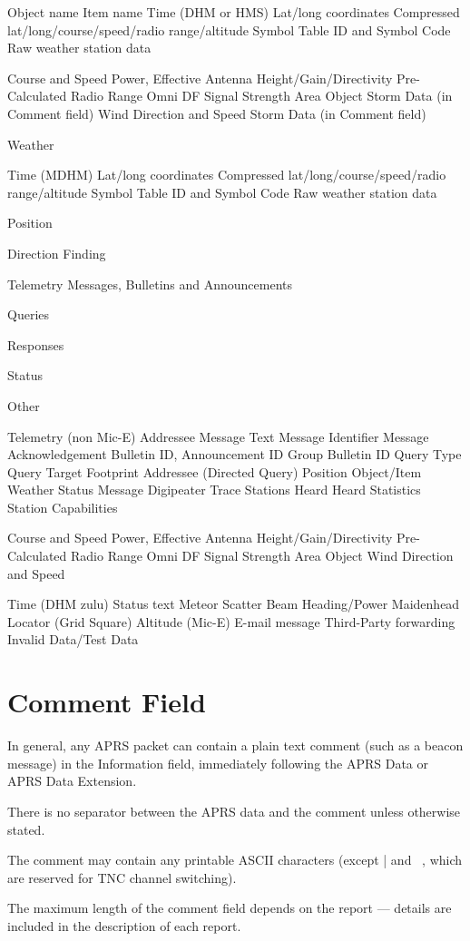 Object name
Item name
Time (DHM or HMS)
Lat/long coordinates
Compressed lat/long/course/speed/radio range/altitude
Symbol Table ID and Symbol Code
Raw weather station data

Course and Speed
Power, Effective Antenna Height/Gain/Directivity
Pre-Calculated Radio Range
Omni DF Signal Strength
Area Object
Storm Data (in Comment field)
Wind Direction and Speed
Storm Data (in Comment field)

Weather

Time (MDHM)
Lat/long coordinates
Compressed lat/long/course/speed/radio range/altitude
Symbol Table ID and Symbol Code
Raw weather station data

Position

Direction Finding

Telemetry
Messages,
Bulletins and
Announcements

Queries

Responses

Status

Other

Telemetry (non Mic-E)
Addressee
Message Text
Message Identifier
Message Acknowledgement
Bulletin ID, Announcement ID
Group Bulletin ID
Query Type
Query Target Footprint
Addressee (Directed Query)
Position
Object/Item
Weather
Status
Message
Digipeater Trace
Stations Heard
Heard Statistics
Station Capabilities

Course and Speed
Power, Effective Antenna Height/Gain/Directivity
Pre-Calculated Radio Range
Omni DF Signal Strength
Area Object
Wind Direction and Speed

Time (DHM zulu)
Status text
Meteor Scatter Beam Heading/Power
Maidenhead Locator (Grid Square)
Altitude (Mic-E)
E-mail message
Third-Party forwarding
Invalid Data/Test Data


\section{Comment Field}

In general, any APRS packet can contain a plain text comment (such as a
beacon message) in the Information field, immediately following the APRS
Data or APRS Data Extension.

There is no separator between the APRS data and the comment unless
otherwise stated.

The comment may contain any printable ASCII characters (except | and ~,
which are reserved for TNC channel switching).

The maximum length of the comment field depends on the report — details
are included in the description of each report.

